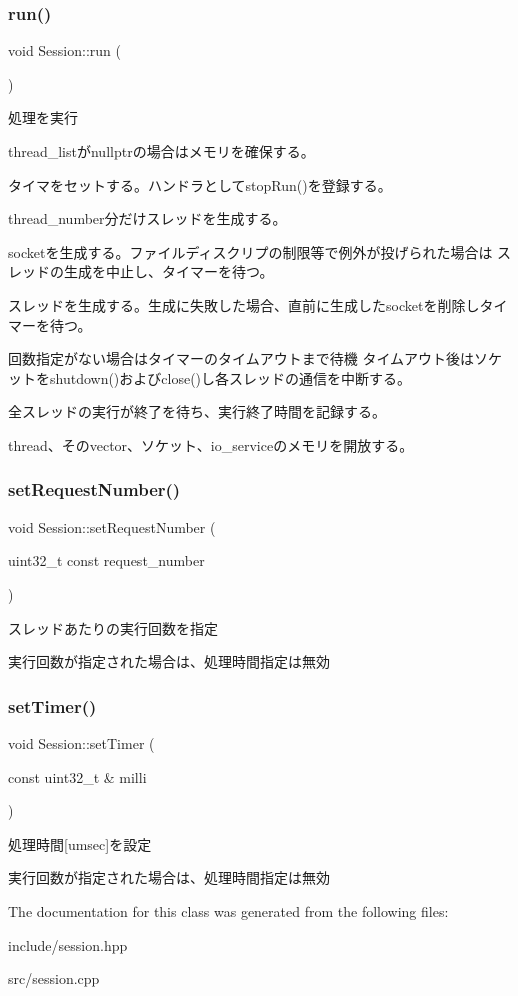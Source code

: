 \subsubsection{\texorpdfstring{run()}{run()}}
{\footnotesize\ttfamily void Session\+::run (\begin{DoxyParamCaption}{ }\end{DoxyParamCaption})}



処理を実行 

thread\+\_\+listがnullptrの場合はメモリを確保する。

タイマをセットする。ハンドラとしてstop\+Run()を登録する。

thread\+\_\+number分だけスレッドを生成する。

socketを生成する。ファイルディスクリプの制限等で例外が投げられた場合は スレッドの生成を中止し、タイマーを待つ。

スレッドを生成する。生成に失敗した場合、直前に生成したsocketを削除しタイマーを待つ。

回数指定がない場合はタイマーのタイムアウトまで待機 タイムアウト後はソケットをshutdown()およびclose()し各スレッドの通信を中断する。

全スレッドの実行が終了を待ち、実行終了時間を記録する。

thread、そのvector、ソケット、io\+\_\+serviceのメモリを開放する。 \mbox{\label{class_session_aebaba3b41feb88ff5ac38bccc9a59145}} 
\subsubsection{\texorpdfstring{setRequestNumber()}{setRequestNumber()}}
{\footnotesize\ttfamily void Session\+::set\+Request\+Number (\begin{DoxyParamCaption}\item[{uint32\+\_\+t const}]{request\+\_\+number }\end{DoxyParamCaption})}



スレッドあたりの実行回数を指定 

実行回数が指定された場合は、処理時間指定は無効 \mbox{\label{class_session_a04178216aff38a635e926a1983f64ff2}} 
\subsubsection{\texorpdfstring{setTimer()}{setTimer()}}
{\footnotesize\ttfamily void Session\+::set\+Timer (\begin{DoxyParamCaption}\item[{const uint32\+\_\+t \&}]{milli }\end{DoxyParamCaption})}



処理時間\mbox{[}umsec\mbox{]}を設定 

実行回数が指定された場合は、処理時間指定は無効 

The documentation for this class was generated from the following files\+:\begin{DoxyCompactItemize}
\item 
include/session.\+hpp\item 
src/session.\+cpp\end{DoxyCompactItemize}
